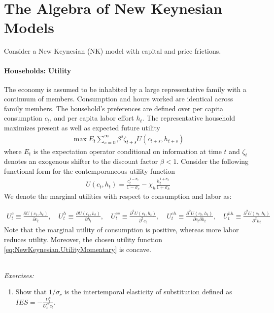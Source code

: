 \section[The Algebra of New Keynesian Models]{The Algebra of New Keynesian Models\label{ex:AlgebraNewKeynesianModels}}
Consider a New Keynesian (NK) model with capital and \textcite{Calvo_1983_StaggeredPricesUtilitymaximizing} price frictions.

\paragraph{Households: Utility}
The economy is assumed to be inhabited by a large representative family with a continuum of members.
Consumption and hours worked are identical across family members.
The household's preferences are defined over per capita consumption $c_t$,
  and per capita labor effort $h_t$.
The representative household maximizes present as well as expected future utility
\begin{align}
	\max E_t \sum_{s=0}^{\infty} \beta^{s} \zeta_{t+s} U(c_{t+s}, h_{t+s}) \label{eq:NewKeynesian.UtilityLifetime}
\end{align}
where $E_t$ is the expectation operator conditional on information at time $t$
  and $\zeta_t$ denotes an exogenous shifter to the discount factor $\beta <1$.
Consider the following functional form for the contemporaneous utility function
\begin{align}
U(c_t, h_t) = \frac{c_t^{1-\sigma_c}}{1-\sigma_c} - \chi_h \frac{h_t^{1+\sigma_h}}{1+\sigma_h} \label{eq:NewKeynesian.UtilityMomentary}
\end{align}
We denote the marginal utilities with respect to consumption and labor as:

{\footnotesize
\begin{align}
U^c_t \equiv \frac{\partial U(c_t,h_t)}{\partial c_t},
\quad
U^h_t \equiv \frac{\partial U(c_t,h_t)}{\partial h_t},
\quad
U^{cc}_t \equiv \frac{\partial^2 U(c_t,h_t)}{\partial^2 c_t},
\quad
U^{ch}_t \equiv \frac{\partial^2 U(c_t,h_t)}{\partial c_t \partial h_t},
\quad
U^{hh}_t \equiv \frac{\partial^2 U(c_t,h_t)}{\partial^2 h_t}
\label{eq:NewKeynesian.UtilityMarginalNotation}
\end{align}
}%
Note that the marginal utility of consumption is positive,
  whereas more labor reduces utility.
Moreover, the chosen utility function \eqref{eq:NewKeynesian.UtilityMomentary} is concave.

~\\\noindent\emph{Exercises:}
\begin{enumerate}
\item Show that $1/\sigma_c$ is the intertemporal elasticity of substitution defined as $IES = -\frac{U_t^c}{U_t^{cc} c_t}$.  
\end{enumerate}

